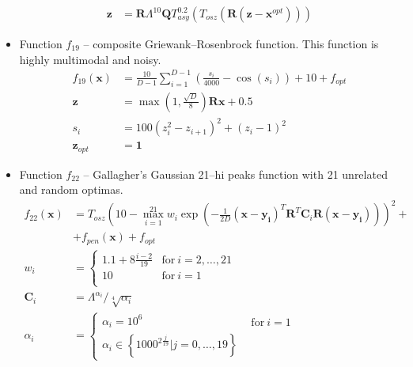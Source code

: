 \begin{itemize}
\begin{align*}
        \mathbf{z} &= \mathbf{R}\Lambda^{10}\mathbf{Q}T_{asy}^{0.2} \left( T_{osz}\left(\mathbf{R}\left(\mathbf{z}-\mathbf{x}^{opt}\right)\right) \right)
    \end{align*}
    \clearpage
    \item Function $f_{19}$ -- composite Griewank--Rosenbrock function. This function is highly multimodal and noisy.
    \begin{align*}
        f_{19}\left(\mathbf{x}\right) &= \frac{10}{D-1}\sum_{i=1}^{D-1}\left( \frac{s_i}{4000} - \cos\left(s_i\right) \right) + 10 + f_{opt}\\
        \mathbf{z} &= \max\left(1,\frac{\sqrt{D}}{8}\right)\mathbf{R}\mathbf{x}+0.5 \\
        s_i &= 100 \left(z_i^2 - z_{i+1}\right)^2 + \left(z_i-1\right)^2 \\
        \mathbf{z}_{opt} &= \mathbf{1}
    \end{align*}
    \item Function $f_{22}$ -- Gallagher's Gaussian 21--hi peaks function with 21 unrelated and random optimas.
    \begin{align*}
        f_{22}\left(\mathbf{x}\right) &= T_{osz}\left( 
            10 - \max_{i=1}^{21} w_i \exp\left( -\frac{1}{2D}\left(\mathbf{x}-\mathbf{y_i}\right)^T\mathbf{R}^T\mathbf{C}_i\mathbf{R}\left(\mathbf{x}-\mathbf{y_i}\right) \right) 
        \right)^2 + \\
        & + f_{pen}(\mathbf{x}) + f_{opt} \\
        w_i &= \left\{
            \begin{array}{ll}
                1.1+8\frac{i-2}{19} & \text{for}\ i=2,\dots,21 \\
                10                  & \text{for}\ i=1 \\
            \end{array}
        \right.
        \\
        \mathbf{C}_i &= \Lambda^{\alpha_i} / \sqrt[4]{\alpha_i} \\
        \alpha_i &= \left\{ 
            \begin{array}{ll}
                \alpha_i = 10^6 & 
                    \begin{array}{l}
                        \text{for}\ i=1
                    \end{array} \\
                \alpha_i \in \left\{1000^{2\frac{j}{19}}|j=0,\dots,19\right\} &
                    \begin{array}{l}

\end{array}
\end{array}
\end{align*}
\end{itemize}
